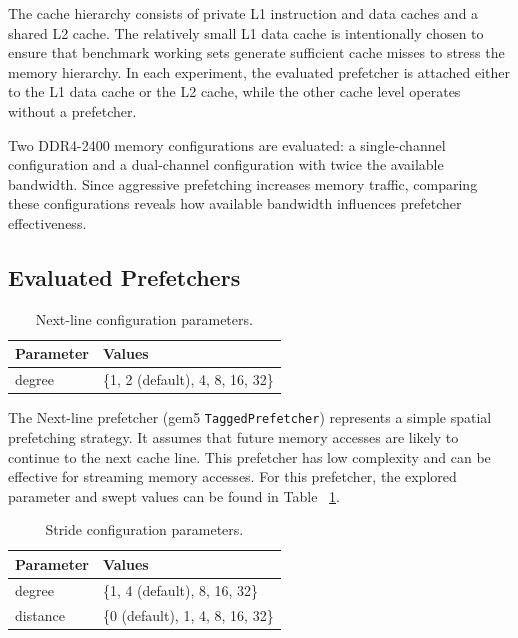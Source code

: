 \documentclass[12pt, letterpaper]{article}
\begin{document}
\noindent The cache hierarchy consists of private L1 instruction and data caches and a shared L2 cache. The relatively small L1 data cache is intentionally chosen to ensure that benchmark working sets generate sufficient cache misses to stress the memory hierarchy. In each experiment, the evaluated prefetcher is attached either to the L1 data cache or the L2 cache, while the other cache level operates without a prefetcher.

\noindent Two DDR4-2400 memory configurations are evaluated: a single-channel configuration and a dual-channel configuration with twice the available bandwidth. Since aggressive prefetching increases memory traffic, comparing these configurations reveals how available bandwidth influences prefetcher effectiveness.

\subsection{Evaluated Prefetchers}
\label{sec:eval:prefetchers}


\begin{table}[h]
\caption{Next-line configuration parameters.}
\centering
\begin{tabular}{l|l}
\hline
\textbf{Parameter} & \textbf{Values} \\ \hline
degree & \{1, 2 (default), 4, 8, 16, 32\} \\ \hline
\end{tabular}
\label{tab:nextlineparams}
\end{table}

\noindent The Next-line prefetcher (gem5 \texttt{TaggedPrefetcher}) represents a simple spatial prefetching strategy. It assumes that future memory accesses are likely to continue to the next cache line. This prefetcher has low complexity and can be effective for streaming memory accesses. For this prefetcher, the explored parameter and swept values can be found in Table ~\ref{tab:nextlineparams}.

\begin{table}[h]
\caption{Stride configuration parameters.}
\centering
\begin{tabular}{l|l}
\hline
\textbf{Parameter} & \textbf{Values} \\ \hline
degree & \{1, 4 (default), 8, 16, 32\} \\
distance & \{0 (default), 1, 4, 8, 16, 32\} \\ \hline
\end{tabular}
\label{tab:strideparams}
\end{table}
\end{document}
